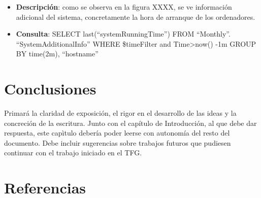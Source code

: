 \documentclass[ spanish, a4paper, 12pt, oneside]{report}
\begin{document}
\begin{itemize}
   \item \textbf{Descripción}: como se observa en la figura XXXX, se ve información adicional del sistema, concretamente la hora de arranque de los ordenadores.
   \item \textbf{Consulta}: SELECT last(``systemRunningTime'') FROM ``Monthly''. ``SystemAdditionalInfo'' WHERE \$timeFilter and Time>now() -1m GROUP BY time(2m), ``hostname''
\end{itemize}

\chapter{Conclusiones}

Primará la claridad de exposición, el rigor en el desarrollo de las ideas y la concreción de la escritura. Junto con el capítulo de Introducción, al que debe dar respuesta, este capìtulo debería poder leerse con autonomía del resto del documento. Debe incluir sugerencias sobre trabajos futuros que pudiesen continuar con el trabajo iniciado en el TFG.
\chapter{Referencias}
\end{document}
